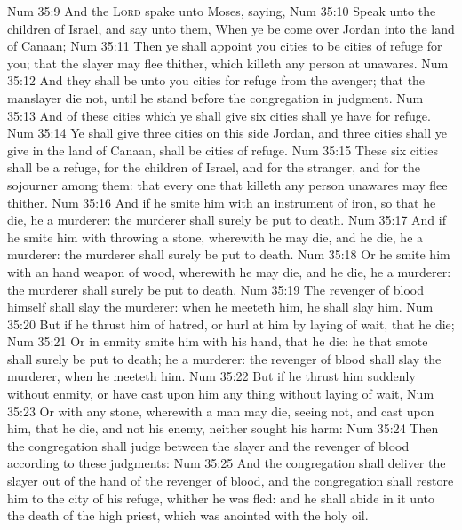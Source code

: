 \vs Num 35:9 And the \textsc{Lord} spake unto Moses, saying,
\vs Num 35:10 Speak unto the children of Israel, and say unto them, When ye be come over Jordan into the land of Canaan;
\vs Num 35:11 Then ye shall appoint you cities to be cities of refuge for you; that the slayer may flee thither, which killeth any person at unawares.
\vs Num 35:12 And they shall be unto you cities for refuge from the avenger; that the manslayer die not, until he stand before the congregation in judgment.
\vs Num 35:13 And of these cities which ye shall give six cities shall ye have for refuge.
\vs Num 35:14 Ye shall give three cities on this side Jordan, and three cities shall ye give in the land of Canaan,  shall be cities of refuge.
\vs Num 35:15 These six cities shall be a refuge,  for the children of Israel, and for the stranger, and for the sojourner among them: that every one that killeth any person unawares may flee thither.
\vs Num 35:16 And if he smite him with an instrument of iron, so that he die, he  a murderer: the murderer shall surely be put to death.
\vs Num 35:17 And if he smite him with throwing a stone, wherewith he may die, and he die, he  a murderer: the murderer shall surely be put to death.
\vs Num 35:18 Or  he smite him with an hand weapon of wood, wherewith he may die, and he die, he  a murderer: the murderer shall surely be put to death.
\vs Num 35:19 The revenger of blood himself shall slay the murderer: when he meeteth him, he shall slay him.
\vs Num 35:20 But if he thrust him of hatred, or hurl at him by laying of wait, that he die;
\vs Num 35:21 Or in enmity smite him with his hand, that he die: he that smote  shall surely be put to death;  he  a murderer: the revenger of blood shall slay the murderer, when he meeteth him.
\vs Num 35:22 But if he thrust him suddenly without enmity, or have cast upon him any thing without laying of wait,
\vs Num 35:23 Or with any stone, wherewith a man may die, seeing  not, and cast  upon him, that he die, and  not his enemy, neither sought his harm:
\vs Num 35:24 Then the congregation shall judge between the slayer and the revenger of blood according to these judgments:
\vs Num 35:25 And the congregation shall deliver the slayer out of the hand of the revenger of blood, and the congregation shall restore him to the city of his refuge, whither he was fled: and he shall abide in it unto the death of the high priest, which was anointed with the holy oil.
